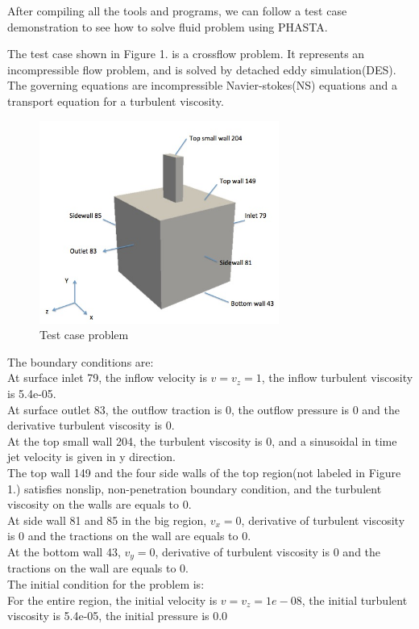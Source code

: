 \documentclass{article}
\begin{document}
After compiling all the tools and programs, we can follow a test case demonstration to see how to solve fluid problem using PHASTA. 

The test case shown in Figure 1. is a crossflow problem. It represents an incompressible flow problem, and is solved by detached eddy simulation(DES). The governing equations are incompressible Navier-stokes(NS) equations and a transport equation for a turbulent viscosity. 
\begin{figure}[h!]
  \centering
    \includegraphics[width=0.7\textwidth]{fig1}
  \caption{Test case problem}
\end{figure}
The boundary conditions are:\\
At surface inlet 79, the inflow velocity is $v = v_z= 1$, the inflow turbulent viscosity is 5.4e-05.\\
At surface outlet 83, the outflow traction is 0, the outflow pressure is 0 and the derivative turbulent viscosity is 0. \\
At the top small wall 204, the turbulent viscosity is 0, and a sinusoidal in time jet velocity is given in y direction. \\
The top wall 149 and the four side walls of the top region(not labeled in Figure 1.) satisfies nonslip, non-penetration boundary condition, and the turbulent viscosity on the walls are equals to 0.\\
At side wall 81 and 85 in the big region, $v_x=0$, derivative of turbulent viscosity is 0 and the tractions on the wall are equals to 0.\\
At the bottom wall 43, $v_y=0$, derivative of turbulent viscosity is 0 and the tractions on the wall are equals to 0.\\
 
The initial condition for the problem is: \\
For the entire region, the initial velocity is $v = v_z = 1e-08$, the initial turbulent viscosity is 5.4e-05, the initial pressure is 0.0 \\ 
\end{document}

